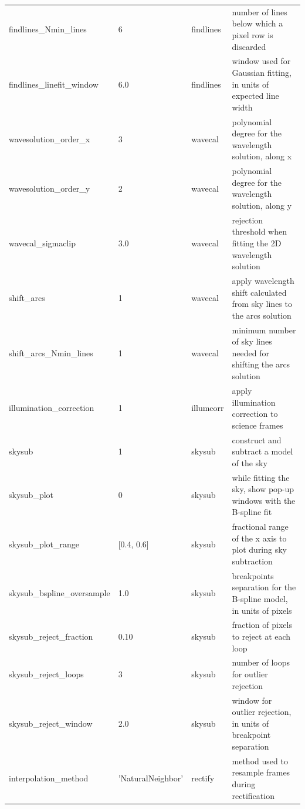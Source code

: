 \documentclass[a4paper]{article}
\begin{document}
\begin{sloppypar}
\begin{table}
{\begin{tabular}{llll}
    findlines\_Nmin\_lines        & 6             & findlines        & number of lines below which a pixel row is discarded \\
    findlines\_linefit\_window    & 6.0           & findlines        & window used for Gaussian fitting, in units of expected line width \\
    wavesolution\_order\_x        & 3             & wavecal          & polynomial degree for the wavelength solution, along x \\
    wavesolution\_order\_y        & 2             & wavecal          & polynomial degree for the wavelength solution, along y \\
    wavecal\_sigmaclip            & 3.0           & wavecal          & rejection threshold when fitting the 2D wavelength solution \\
    shift\_arcs                   & 1             & wavecal          & apply wavelength shift calculated from sky lines to the arcs solution \\
    shift\_arcs\_Nmin\_lines      & 1             & wavecal          & minimum number of sky lines needed for shifting the arcs solution \\
    illumination\_correction      & 1             & illumcorr        & apply illumination correction to science frames \\
    skysub                        & 1             & skysub           & construct and subtract a model of the sky \\
    skysub\_plot                  & 0             & skysub           & while fitting the sky, show pop-up windows with the B-spline fit \\
    skysub\_plot\_range           & [0.4, 0.6]    & skysub           & fractional range of the x axis to plot during sky subtraction \\
    skysub\_bspline\_oversample   & 1.0           & skysub           & breakpoints separation for the B-spline model, in units of pixels \\
    skysub\_reject\_fraction      & 0.10          & skysub           & fraction of pixels to reject at each loop \\
    skysub\_reject\_loops         & 3             & skysub           & number of loops for outlier rejection \\
    skysub\_reject\_window        & 2.0           & skysub           & window for outlier rejection, in units of breakpoint separation \\
    interpolation\_method         & 'NaturalNeighbor'  & rectify     & method used to resample frames during rectification \\

\end{tabular}}
\end{table}
\end{sloppypar}
\end{document}
